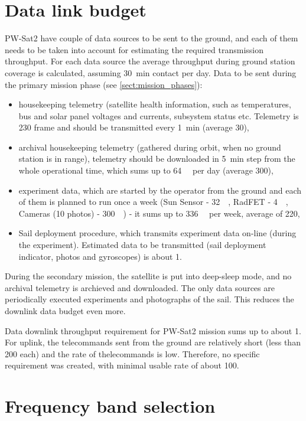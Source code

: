 \section{Data link budget}
PW-Sat2 have couple of data sources to be sent to the ground, and each of them needs to be taken into account for estimating the required transmission throughput. For each data source the average throughput during ground station coverage is calculated, assuming \SI{30}{\minute} contact per day.
Data to be sent during the primary mission phase (see \ref{sect:mission_phases}):
\begin{itemize}
    \item housekeeping telemetry (satellite health information, such as temperatures, bus and solar panel voltages and currents, subsystem status etc. Telemetry is \SI{230}{\byte} frame and should be transmitted every \SI{1}{\minute} (average \SI{30}{\bps}),
    \item archival housekeeping telemetry (gathered during orbit, when no ground station is in range), telemetry should be downloaded in \SI{5}{\minute} step from the whole operational time, which sums up to \SI{64}{\kilo\byte} per day (average \SI{300}{\bps}),
    \item experiment data, which are started by the operator from the ground and each of them is planned to run once a week (Sun Sensor -  \SI{32}{\kilo\byte}, RadFET - \SI{4}{\kilo\byte}, Cameras (10 photos) - \SI{300}{\kilo\byte}) - it sums up to \SI{336}{\kilo\byte} per week, average of \SI{220}{\bps},
    \item Sail deployment procedure, which transmits experiment data on-line (during the experiment). Estimated data to be transmitted (sail deployment indicator, photos and gyroscopes) is about \SI{1}{\kbps}.
\end{itemize}
During the secondary mission, the satellite is put into deep-sleep mode, and no archival telemetry is archieved and downloaded. The only data sources are periodically executed experiments and photographs of the sail. This reduces the downlink data budget even more.

Data downlink throughput requirement for PW-Sat2 mission sums up to about \SI{1}{\kbps}.
For uplink, the telecommands sent from the ground are relatively short (less than \SI{200}{\byte} each) and the rate of thelecommands is low. Therefore, no specific requirement was created, with minimal usable rate of about \SI{100}{\bps}.

\section{Frequency band selection}

